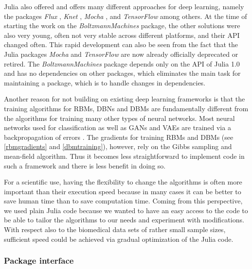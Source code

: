 \documentclass[12pt]{article}
\newcommand{\apkg}[1]{\emph{#1}}
\begin{document}
Julia also offered and offers many different approaches for deep learning, namely the packages \apkg{Flux} \citep{flux}, \apkg{Knet} \citep{knetjl}, \apkg{Mocha} \citep{mochajl}, and \apkg{TensorFlow} \citep{tensorflowjl} among others.
At the time of starting the work on the \apkg{BoltzmannMachines} package, the other solutions were also very young, often not very stable across different platforms, and their API changed often.
This rapid development can also be seen from the fact that the Julia packages \apkg{Mocha} and \apkg{TensorFlow} are now already officially deprecated or retired.
The \apkg{BoltzmannMachines} package depends only on the API of Julia 1.0 and has no dependencies on other packages, which eliminates the main task for maintaining a package, which is to handle changes in dependencies.

Another reason for not building on existing deep learning frameworks is that the training algorithms for RBMs, DBNs and DBMs are fundamentally different from the algorithms for training many other types of neural networks.
Most neural networks used for classification as well as GANs and VAEs are trained via a backpropagation of errors \citep{backpropagation}.
The gradients for training RBMs and DBMs (see \ref{rbmgradients} and \ref{dbmtraining}), however, rely on the Gibbs sampling and mean-field algorithm.
Thus it becomes less straightforward to implement code in such a framework and there is less benefit in doing so.

For a scientific use, having the flexibility to change the algorithms is often more important than their execution speed because in many cases it can be better to save human time than to save computation time.
Coming from this perspective, we used plain Julia code because we wanted to have an easy access to the code to be able to tailor the algorithms to our needs and experiment with modifications.
With respect also to the biomedical data sets of rather small sample sizes, sufficient speed could be achieved via gradual optimization of the Julia code.



\subsubsection{Package interface}
\end{document}
